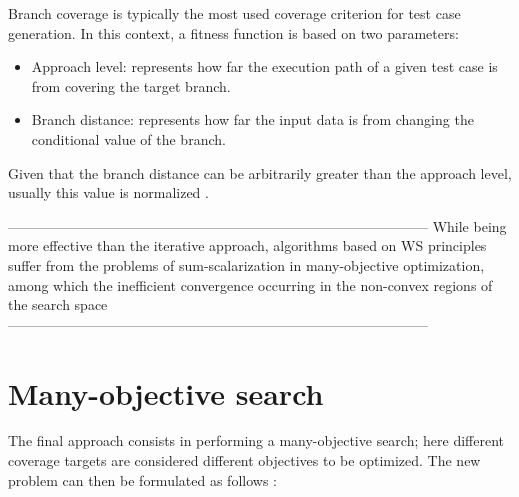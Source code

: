 Branch coverage is typically the most used coverage criterion for test case generation. In this context, a fitness function
is based on two parameters: 
\begin{itemize}
    \item Approach level: represents how far the execution path of a given test case is from covering the target branch.
    \item Branch distance: represents how far the input data is from changing the conditional value of the branch.
\end{itemize}
Given that the branch distance can be arbitrarily greater than the approach level, usually this value is normalized \cite{DBLP:conf/icst/Arcuri10}.

------------------------------------------------------------------------------------------
While being more effective than the iterative approach, algorithms based on WS principles suffer from the problems of sum-scalarization in many-objective optimization, among which the inefficient convergence occurring in the non-convex regions of the search space
------------------------------------------------------------------------------------------

\section{Many-objective search}
The final approach consists in performing a many-objective search; here different coverage targets are considered different objectives to be optimized.
The new problem can then be formulated as follows \cite{DBLP:journals/tse/PanichellaKT18}:

